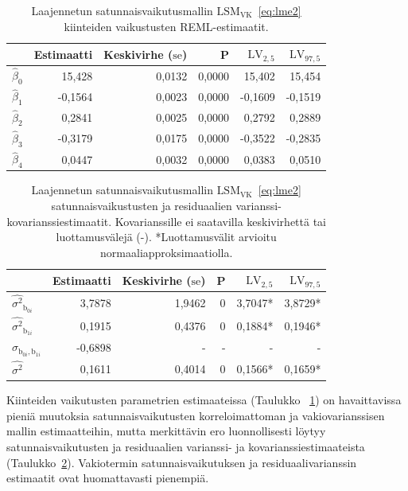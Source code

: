 \documentclass[finnish]{docopts}
\begin{document}
\begin{table}[H]
\centering
\begin{tabular}{lrrrrr}
\toprule
  & Estimaatti & Keskivirhe ($\text{se}$) & P & $\text{LV}_{2,5}$ & $\text{LV}_{97,5}$\\
\midrule
$\hat{\beta}_0$ & 15,428 & 0,0132 & 0,0000 & 15,402 & 15,454\\
$\hat{\beta}_1$ & -0,1564 & 0,0023 & 0,0000 & -0,1609 & -0,1519\\
$\hat{\beta}_2$ & 0,2841 & 0,0025 & 0,0000 & 0,2792 & 0,2889\\
$\hat{\beta}_3$ & -0,3179 & 0,0175 & 0,0000 & -0,3522 & -0,2835\\
$\hat{\beta}_4$ & 0,0447 & 0,0032 & 0,0000 & 0,0383 & 0,0510\\
\bottomrule
\end{tabular}
\caption{Laajennetun satunnaisvaikutusmallin $\text{LSM}_{\text{VK}}$~\ref{eq:lme2} kiinteiden vaikustusten REML-estimaatit.}
\label{table:lme2vk}
\end{table}

\begin{table}[H]
\centering
\begin{tabular}{lrrrrr}
\toprule
  & Estimaatti & Keskivirhe ($\text{se}$) & P & $\text{LV}_{2,5}$ & $\text{LV}_{97,5}$\\
\midrule
$\hat{\sigma^2}_{\text{b}_{0i}}$ & 3,7878 & 1,9462 & 0 & 3,7047* & 3,8729* \\
$\hat{\sigma^2}_{\text{b}_{1i}}$ & 0,1915 & 0,4376 & 0 & 0,1884* & 0,1946* \\
$\hat{\sigma}_{\text{b}_{0i}, \text{b}_{1i}}$ & -0,6898 & - & - & - & - \\
\addlinespace
$\hat{\sigma^2}$ & 0,1611 & 0,4014 & 0 & 0,1566* & 0,1659* \\
\bottomrule
\end{tabular}
\caption{Laajennetun satunnaisvaikutusmallin $\text{LSM}_{\text{VK}}$~\ref{eq:lme2} satunnaisvaikustusten ja residuaalien varianssi-kovarianssiestimaatit. Kovarianssille ei saatavilla keskivirhettä tai luottamusvälejä (-). *Luottamusvälit arvioitu normaaliapproksimaatiolla.}
\label{table:lme3vk}
\end{table}

Kiinteiden vaikutusten parametrien estimaateissa (Taulukko ~\ref{table:lme2vk}) on havaittavissa pieniä muutoksia satunnaisvaikutusten korreloimattoman ja vakiovarianssisen mallin estimaatteihin, mutta merkittävin ero luonnollisesti löytyy satunnaisvaikutusten ja residuaalien varianssi- ja kovarianssiestimaateista (Taulukko~\ref{table:lme3vk}). Vakiotermin satunnaisvaikutuksen ja residuaalivarianssin estimaatit ovat huomattavasti pienempiä.\\
\end{document}
